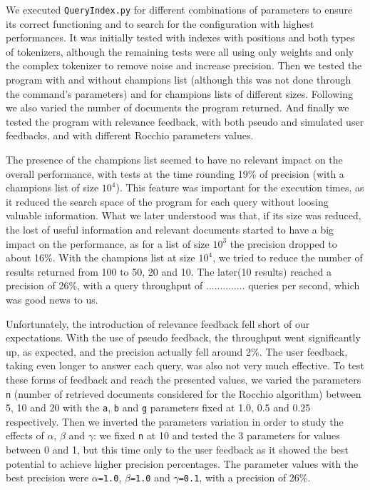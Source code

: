 \documentclass[12pt]{article}
\begin{document}
\newpage
We executed \texttt{QueryIndex.py} for different combinations of parameters to
ensure its correct functioning and to search for the configuration with highest 
performances.
It was initially tested with indexes with positions and both types of tokenizers, 
although the remaining tests were all using only weights
and only the complex tokenizer to remove noise and increase precision.
Then we tested the program with and without champions list (although this was
not done through the command's parameters) and for champions lists of different sizes.
Following we also varied the number of documents the program returned.
And finally we tested the program with relevance feedback, with both pseudo and
simulated user feedbacks, and with different Rocchio parameters values.

The presence of the champions list seemed to have no relevant impact on the 
overall performance, with tests at the time rounding 19\% of precision
(with a champions list of size $10^4$).
This feature was important for the execution times, as it reduced the search 
space of the program for each query without loosing valuable information.
What we later understood was that, if its size was reduced, the lost of useful
information and relevant documents started to have a big impact on the performance,
as for a list of size $10^3$ the precision dropped to about 16\%.
With the champions list at size $10^4$, we tried to reduce the number of results
returned from 100 to 50, 20 and 10. 
The later(10 results) reached a precision of 26\%, with a query throughput of ..............
queries per second, which was good news to us.

Unfortunately, the introduction of relevance feedback fell short of our expectations.
With the use of pseudo feedback, the throughput went significantly up, as expected,
and the precision actually fell around 2\%.
The user feedback, taking even longer to answer each query, was also not very
much effective.
To test these forms of feedback and reach the presented values, we varied the 
parameters \texttt{n} (number of retrieved documents considered for the Rocchio 
algorithm) between 5, 10 and 20 with the \texttt{a}, \texttt{b} and \texttt{g} 
parameters fixed at 1.0, 0.5 and 0.25 respectively.
Then we inverted the parameters variation in order to study the effects of 
$\alpha$, $\beta$ and $\gamma$: we fixed \texttt{n} at 10 and tested the 3 
parameters for values between 0 and 1, but this time only to the user feedback 
as it showed the best  potential to achieve higher precision percentages.
The parameter values with the best precision were \texttt{$\alpha$=1.0}, 
\texttt{$\beta$=1.0} and \texttt{$\gamma$=0.1}, with a precision of 26\%.
\end{document}

